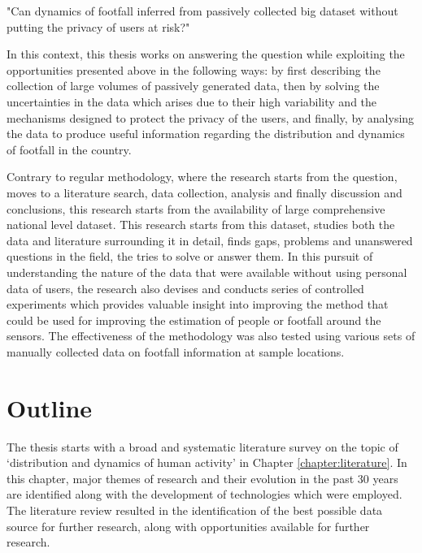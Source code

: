 \begin{displayquote}
  "Can dynamics of footfall inferred from passively collected big dataset without putting the privacy of users at risk?"
\end{displayquote}

In this context, this thesis works on answering the question while exploiting the  opportunities presented above in the following ways: by first describing the collection of large volumes of passively generated data, then by solving the uncertainties in the data which arises due to their high variability and the mechanisms designed to protect the privacy of the users, and finally, by analysing the data to produce useful information regarding the distribution and dynamics of footfall in the country.

Contrary to regular methodology, where the research starts from the question, moves to a literature search, data collection, analysis and finally discussion and conclusions, this research starts from the availability of large comprehensive national level dataset.
This research starts from this dataset, studies both the data and literature surrounding it in detail, finds gaps, problems and unanswered questions in the field, the tries to solve or answer them.
In this pursuit of understanding the nature of the data that were available without using personal data of users, the research also devises and conducts series of controlled experiments which provides valuable insight into improving the method that could be used for improving the estimation of people or footfall around the sensors.
The effectiveness of the methodology was also tested using various sets of manually collected data on footfall information at sample locations.

\section{Outline}

The thesis starts with a broad and systematic literature survey on the topic of `distribution and dynamics of human activity' in Chapter \ref{chapter:literature}.
In this chapter, major themes of research and their evolution in the past 30 years are identified along with the development of technologies which were employed.
The literature review resulted in the identification of the best possible data source for further research, along with opportunities available for further research.

